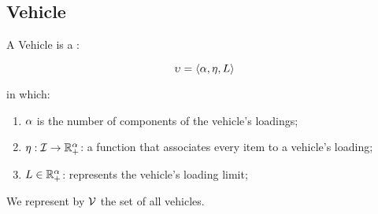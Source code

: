 \subsection{Vehicle}

A Vehicle \vehicleO is a :

\begin{equation}
	\label{definition:vehicle}
	\upsilon = \langle
		\alpha,
		\eta,
		L
	\rangle
\end{equation}

in which:

\begin{enumerate}
	\item $\alpha$ is the number of components of the vehicle's loadings;
	\item $\eta: \mathcal{I} \rightarrow \mathbb{R}_{+}^{\alpha}$: a function that associates every item to a vehicle's loading;
	\item $L \in \mathbb{R}_{+}^{\alpha}$: represents the vehicle's loading limit;
\end{enumerate}

We represent by $\mathcal{V}$ the set of all vehicles.
